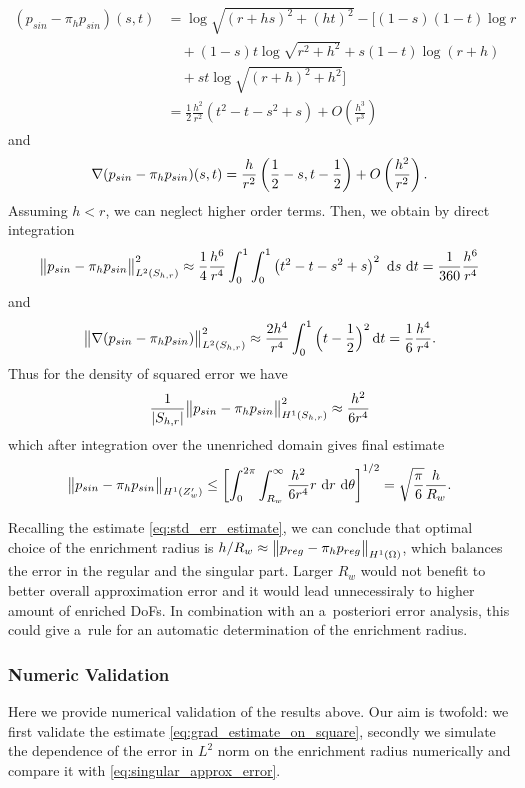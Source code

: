 \begin{align*}
 (p_{sin} - \pi_h p_{sin})(s,t)&=\log\sqrt{(r+hs)^2+(ht)^2} -\Big[(1-s)(1-t)\log r\\
 &\quad+ (1-s)t\log\sqrt{r^2+h^2} + s(1-t) \log(r+h) \\
 &\quad+ st\log\sqrt{(r+h)^2+h^2} \Big]\\
 &=\frac12 \frac{h^2}{r^2}\left(t^2-t - s^2 +s\right) + O\left(\frac{h^3}{r^3}\right)
\end{align*}
and 
\begin{equation}
 \nabla(p_{sin} - \pi_h p_{sin})(s,t) = \frac{h}{r^2} \left( \frac12-s, t-\frac12 \right) + O\left(\frac{h^2}{r^2}\right).
\end{equation}
Assuming $h<r$, we can neglect higher order terms. Then, we obtain by direct integration
\begin{align*}
 \bigl\Vert p_{sin} - \pi_h p_{sin}\bigr\Vert^2_{L^2(S_{h,r})} \approx \frac14 \frac{h^6}{r^4}\int_0^1\int_0^1 \left(t^2-t-s^2+s\right)^2\,\,{\rm d} s\, \,{\rm d} t = \frac{1}{360}\frac{h^6}{r^4} 
\end{align*}
and
\begin{equation}
    \label{eq:grad_estimate_on_square}
    \bigl\Vert\nabla(p_{sin} - \pi_h p_{sin})\bigr\Vert^2_{L^2(S_{h,r})} \approx \frac{2h^4}{r^4} \int_0^1 \Big(t-\frac12\Big)^2 \,{\rm d} t = \frac{1}{6}\frac{h^4}{r^4}.
\end{equation}
Thus for the density of squared error we have
\[
    \frac{1}{\left|S_{h,r}\right|} \bigl\Vert p_{sin} - \pi_h p_{sin}\bigr\Vert^2_{H^1(S_{h,r})} \approx \frac{h^2}{6r^4}
\]
which after integration over the unenriched domain gives final estimate
\begin{equation}
    \label{eq:singular_approx_error}
    \bigl\Vert p_{sin} - \pi_h p_{sin}\bigr\Vert_{H^1(Z'_w)} \le \left[\int_0^{2\pi} \int_{R_w}^\infty \frac{h^2} {6r^4} r \,\,{\rm d} r\, \,{\rm d} \theta\right]^{1/2} = \sqrt\frac{\pi}{6}\frac{h}{R_w}. 
\end{equation}

Recalling the estimate \eqref{eq:std_err_estimate}, we can conclude that optimal choice of the enrichment radius is $h/R_w\approx \bigl\Vert p_{reg}-\pi_h p_{reg}\bigr\Vert_{H^1(\Omega)}$, 
which balances the error in the regular and the singular part. Larger $R_w$ would not benefit to better overall approximation error and it would lead unnecessiraly to
higher amount of enriched DoFs.
In combination with an a~posteriori error analysis, this could give a~rule for an automatic
determination of the enrichment radius.

\subsubsection{Numeric Validation}
Here we provide numerical validation of the results above.
Our aim is twofold: we first validate the estimate \eqref{eq:grad_estimate_on_square}, secondly we simulate 
the dependence of the error in $L^2$ norm on the enrichment radius numerically and compare it with \eqref{eq:singular_approx_error}.

